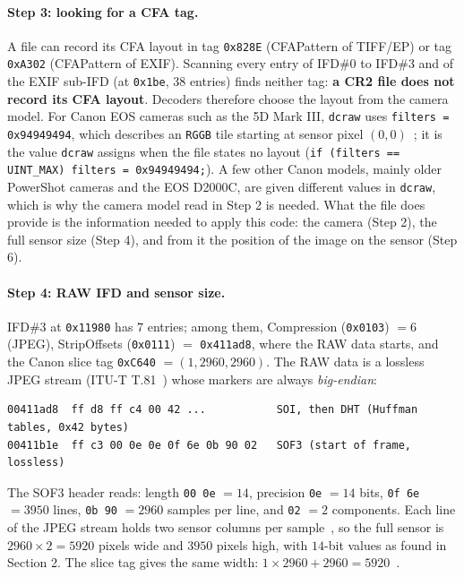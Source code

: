 \documentclass[a4paper]{article}
\begin{document}
\paragraph{Step 3: looking for a CFA tag.} A file can record its CFA layout in tag \texttt{0x828E} (CFAPattern of TIFF/EP) or tag \texttt{0xA302} (CFAPattern of EXIF). Scanning every entry of IFD\#0 to IFD\#3 and of the EXIF sub-IFD (at \texttt{0x1be}, $38$ entries) finds neither tag: \textbf{a CR2 file does not record its CFA layout}. Decoders therefore choose the layout from the camera model. For Canon EOS cameras such as the 5D Mark III, \texttt{dcraw} uses \texttt{filters = 0x94949494}, which describes an \texttt{RGGB} tile starting at sensor pixel $(0, 0)$~\cite{lclevy_cr2, dcraw}; it is the value \texttt{dcraw} assigns when the file states no layout (\texttt{if (filters == UINT\_MAX) filters = 0x94949494;}). A few other Canon models, mainly older PowerShot cameras and the EOS D2000C, are given different values in \texttt{dcraw}, which is why the camera model read in Step 2 is needed. What the file does provide is the information needed to apply this code: the camera (Step 2), the full sensor size (Step 4), and from it the position of the image on the sensor (Step 6).

\paragraph{Step 4: RAW IFD and sensor size.} IFD\#3 at \texttt{0x11980} has $7$ entries; among them, Compression (\texttt{0x0103}) $= 6$ (JPEG), StripOffsets (\texttt{0x0111}) $=$ \texttt{0x411ad8}, where the RAW data starts, and the Canon slice tag \texttt{0xC640} $= (1, 2960, 2960)$. The RAW data is a lossless JPEG stream (ITU-T T.81~\cite{itu_t81}) whose markers are always \emph{big-endian}:
\begin{lstlisting}[language={}, numbers=none]
00411ad8  ff d8 ff c4 00 42 ...           SOI, then DHT (Huffman tables, 0x42 bytes)
00411b1e  ff c3 00 0e 0e 0f 6e 0b 90 02   SOF3 (start of frame, lossless)
\end{lstlisting}
The SOF3 header reads: length \texttt{00 0e} $= 14$, precision \texttt{0e} $= 14$ bits, \texttt{0f 6e} $= 3950$ lines, \texttt{0b 90} $= 2960$ samples per line, and \texttt{02} $= 2$ components. Each line of the JPEG stream holds two sensor columns per sample~\cite{libopenraw_cr2}, so the full sensor is $2960 \times 2 = 5920$ pixels wide and $3950$ pixels high, with $14$-bit values as found in Section 2. The slice tag gives the same width: $1 \times 2960 + 2960 = 5920$~\cite{swetake_cr2}.
\end{document}
